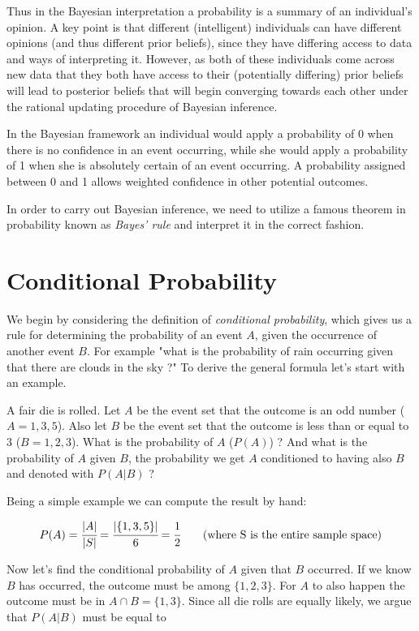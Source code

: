 Thus in the Bayesian interpretation a probability is a summary of an individual's opinion. A key point is that different (intelligent) individuals can have different opinions (and thus different prior beliefs), since they have differing access to data and ways of interpreting it. However, as both of these individuals come across new data that they both have access to their (potentially differing) prior beliefs will lead to posterior beliefs that will begin converging towards each other under the rational updating procedure of Bayesian inference.

In the Bayesian framework an individual would apply a probability of 0 when there is no confidence in an event occurring, while she would apply a probability of 1 when she is absolutely certain of an event occurring. A probability assigned between 0 and 1 allows weighted confidence in other potential outcomes.

In order to carry out Bayesian inference, we need to utilize a famous theorem in probability known as \emph{Bayes' rule} and interpret it in the correct fashion.

\section{Conditional Probability}
\label{sec:conditional_prob}
We begin by considering the definition of \emph{conditional probability}, which gives us a rule for determining the probability of an event $A$, given the occurrence of another event $B$. For example "what is the probability of rain occurring given that there are clouds in the sky ?"
To derive the general formula let's start with an example.

A fair die is rolled. Let $A$ be the event set that the outcome is an odd number ($A={1,3,5}$). Also let $B$ be the event set that the outcome is less than or equal to $3$ ($B={1,2,3}$). What is the probability of $A$ ($P(A)$) ? And what is the probability of $A$ given $B$, the probability we get $A$ conditioned to having also $B$ and denoted with $P(A|B)$ ?

Being a simple example we can compute the result by hand:

\begin{equation}
P(A) = \cfrac{|A|}{|S|} = \cfrac{|\{1,3,5\}|}{6} = \cfrac{1}{2}\qquad\textrm{(where S is the entire sample space)}
\end{equation}

Now let's find the conditional probability of $A$ given that $B$ occurred. If we know $B$ has occurred, the outcome must be among $\{1,2,3\}$. For $A$ to also happen the outcome must be in $A\cap B = \{1,3\}$. Since all die rolls are equally likely, we argue that $P(A|B)$ must be equal to


